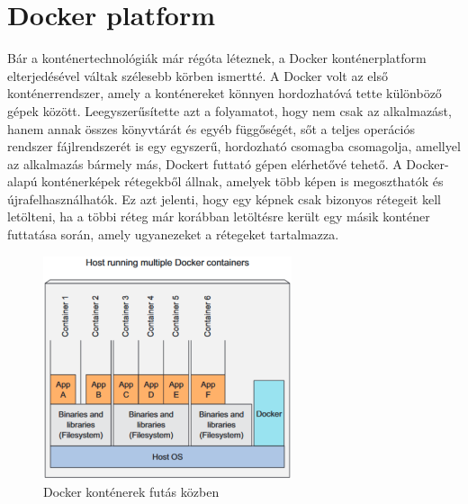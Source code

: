 \section{Docker platform}

Bár a konténertechnológiák már régóta léteznek, a Docker konténerplatform elterjedésével
váltak szélesebb körben ismertté. A Docker volt az első konténerrendszer, amely a konténereket könnyen hordozhatóvá tette különböző gépek között. Leegyszerűsítette azt a folyamatot, hogy nem csak az alkalmazást, hanem annak összes könyvtárát és egyéb függőségét, sőt a teljes operációs rendszer fájlrendszerét is egy egyszerű, hordozható csomagba csomagolja, amellyel az alkalmazás bármely más, Dockert futtató gépen elérhetővé tehető. A Docker-alapú konténerképek rétegekből állnak, amelyek több képen is megoszthatók és újrafelhasználhatók. Ez azt jelenti, hogy egy képnek csak bizonyos rétegeit kell letölteni, ha a többi réteg már korábban letöltésre került egy másik konténer futtatása során, amely ugyanezeket a rétegeket tartalmazza.
\cite{Marko17}

\begin{figure}[ht]
    \centering
         \includegraphics[width=0.65\textwidth]{figures/docker/running-contaiers.png}
          \caption{Docker konténerek futás közben \cite{Marko17}}
           \label{running-containers}
\end{figure}